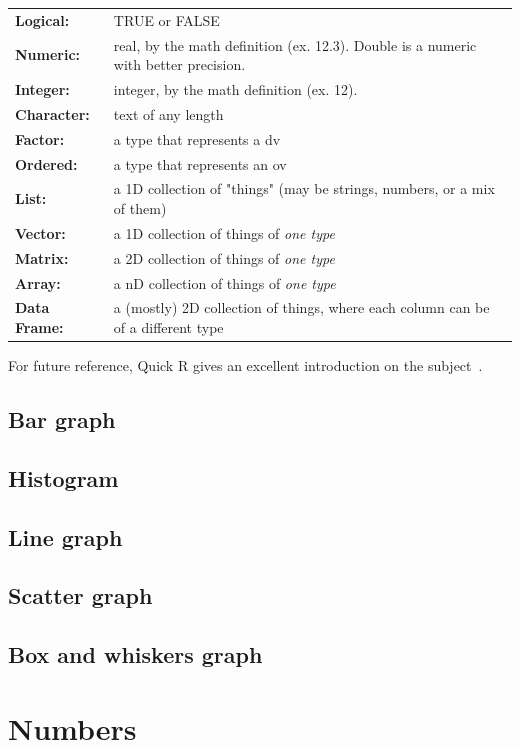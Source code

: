 \documentclass{report}
\begin{document}
\begin{tcolorbox}[title=R types]
\begin{tabularx}{\textwidth}{>{\bfseries}l X}
Logical: & TRUE or FALSE\\[0.2cm]
Numeric: & real, by the math definition (ex. 12.3). Double is a numeric with better precision.\\[0.2cm]
Integer: & integer, by the math definition (ex. 12).\\[0.2cm]
Character: & text of any length\\[0.2cm]
Factor: & a type that represents a \gls{dv}\\[0.2cm]
Ordered: & a type that represents an \gls{ov}\\[0.2cm]
List: & a 1D collection of "things" (may be strings, numbers, or a mix of them)\\[0.2cm]
Vector: & a 1D collection of things of \emph{one type}\\[0.2cm]
Matrix: & a 2D collection of things of \emph{one type}\\[0.2cm]
Array: & a nD collection of things of \emph{one type}\\[0.2cm]
Data Frame: & a (mostly) 2D collection of things, where each column can be of a different type
\end{tabularx}
For future reference, Quick R gives an excellent introduction on the subject~\cite{quickr}.
\end{tcolorbox}
	\subsection{Bar graph}
	\subsection{Histogram}
	\subsection{Line graph}
	\subsection{Scatter graph}
	\subsection{Box and whiskers graph}
	\section{Numbers}
\end{document}
